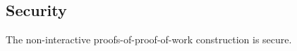 \subsection{Security}

%
%
\begin{theorem}
    \label{thm.security}
    The non-interactive proofs-of-proof-of-work construction is secure.
\end{theorem}


